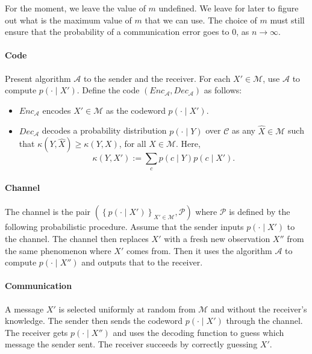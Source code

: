 For the moment, we leave the value of $m$ undefined. We leave for later to figure out what is the maximum value of $m$ that we can use. The choice of $m$ must still ensure that the probability of a communication error goes to 0, as $n \to \infty$.

\paragraph{Code} Present algorithm $\mathcal{A}$ to the sender and the receiver. For each $X' \in \mathcal{M}$, use $\mathcal{A}$ to compute $p(\cdot \mid X')$. Define the code $(\mathit{Enc}_{\mathcal{A}}, \mathit{Dec}_{\mathcal{A}})$ as follows:

\begin{itemize}
\item $\mathit{Enc}_{\mathcal{A}}$ encodes $X' \in \mathcal{M}$ as the codeword $p(\cdot \mid X')$.
\item $\mathit{Dec}_{\mathcal{A}}$ decodes a probability distribution $p(\cdot \mid Y)$ over $\mathcal{C}$ as any $\hat{X} \in \mathcal{M}$ such that $\kappa\left(Y, \hat{X}\right) \geq \kappa\left(Y, X\right)$, for all $X \in \mathcal{M}$. Here,
%
$$\kappa\left(Y, X'\right) := \sum_c p(c \mid Y)p(c \mid X').$$
%
\end{itemize}

\paragraph{Channel} The channel is the pair $\left(\left\{p(\cdot \mid X')\right\}_{X' \in \mathcal{M}}, \mathcal{P}\right)$ where $\mathcal{P}$ is defined by the following probabilistic procedure. Assume that the sender inputs $p(\cdot \mid X')$ to the channel. The channel then replaces $X'$ with a fresh new observation $X''$ from the same phenomenon where $X'$ comes from. Then it uses the algorithm $\mathcal{A}$ to compute $p(\cdot \mid X'')$ and outputs that to the receiver.

\paragraph{Communication} A message $X'$ is selected uniformly at random from $\mathcal{M}$ and without the receiver's knowledge. The sender then sends the codeword $p(\cdot \mid X')$ through the channel. The receiver gets $p(\cdot \mid X'')$ and uses the decoding function to guess which message the sender sent. The receiver succeeds by correctly guessing $X'$.

